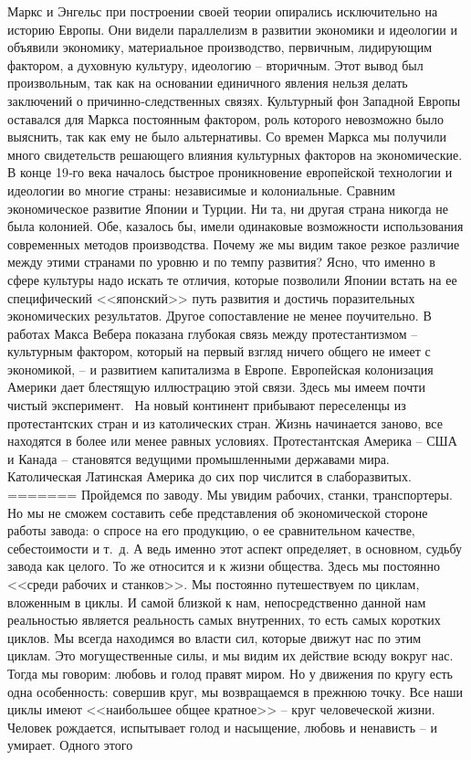 \documentclass{book}
\begin{document}
Маркс и Энгельс при построении своей теории опирались исключительно на историю Европы. Они видели параллелизм в развитии экономики и идеологии и объявили экономику, материальное производство, первичным, лидирующим фактором, а духовную культуру, идеологию -- вторичным. Этот вывод был произвольным, так как на основании единичного явле­ния нельзя делать заключений о причинно‑следственных связях. Культурный фон Западной Европы оставался для Маркса постоянным фактором, роль которого невозможно было выяснить, так как ему не было альтернативы. Со времен Маркса мы получили много свидетельств решающего влияния культурных факторов на экономические. В конце 19‑го века началось быстрое проникновение европейской технологии и идеологии во многие страны: независимые и колониальные. Сравним экономическое развитие Японии и Турции. Ни та, ни другая страна никогда не была колонией. Обе, казалось бы, имели оди­наковые возможности использования современных методов производства. Почему же мы видим такое резкое различие между этими странами по уровню и по темпу развития? Ясно, что именно в сфере культуры надо искать те отличия, которые позволили Японии встать на ее специфический <<японский>> путь развития и достичь поразительных экономических резуль­татов. Другое сопоставление не менее поучительно. В работах Макса Вебера показана глубокая связь между протестантиз­мом -- культурным фактором, который на первый взгляд ничего общего не имеет с экономикой, -- и развитием капита­лизма в Европе. Европейская колонизация Америки дает блес­тящую иллюстрацию этой связи. Здесь мы имеем почти чистый эксперимент.  На новый континент прибывают переселенцы из протестантских стран и из католических стран. Жизнь на­чинается заново, все находятся в более или менее равных усло­виях. Протестантская Америка -- США и Канада -- становятся ведущими промышленными державами мира. Католическая Латинская Америка до сих пор числится в слаборазвитых.
=======
Пройдемся по заводу. Мы увидим рабочих, станки, транспор­теры. Но мы не сможем составить себе представления об экономической стороне работы завода: о спросе на его продукцию, о ее сравнительном качестве, себестоимости и т.~д. А ведь именно этот аспект определяет, в основном, судьбу завода как целого. То же относится и к жизни общества. Здесь мы постоянно <<среди рабочих и станков>>. Мы постоянно путешествуем по циклам, вложенным в циклы. И самой близкой к нам, непос­редственно данной нам реальностью является реальность самых внутренних, то есть самых коротких циклов. Мы всегда нахо­димся во власти сил, которые движут нас по этим циклам. Это могущественные силы, и мы видим их действие всюду вокруг нас. Тогда мы говорим: любовь и голод правят миром. Но у движения по кругу есть одна особенность: совершив круг, мы возвращаемся в прежнюю точку. Все наши циклы имеют <<наибольшее общее кратное>> -- круг человеческой жизни. Человек рождается, испытывает голод и насыщение, любовь и нена­висть -- и умирает. Одного этого 
\end{document}
